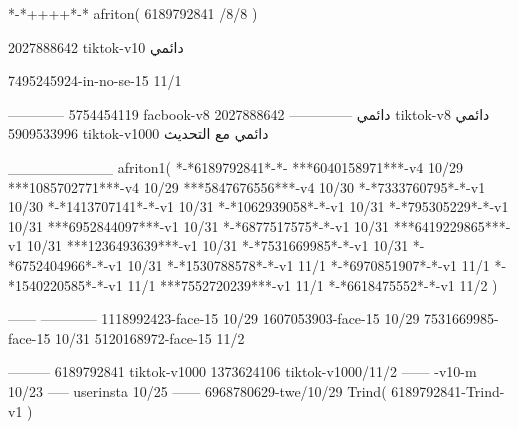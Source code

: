 *-*++++*-*
afriton(
6189792841 /8/8
)

2027888642 tiktok-v10
دائمي


7495245924-in-no-se-15 11/1

------------
5754454119 facbook-v8
دائمي
--------------
2027888642 tiktok-v8
دائمي
5909533996 tiktok-v1000
دائمي مع التحديث

__________
afriton1(
*-*6189792841*-*-
***6040158971***-v4 10/29
***1085702771***-v4 10/29
***5847676556***-v4 10/30
*-*7333760795*-*-v1 10/30
*-*1413707141*-*-v1 10/31
*-*1062939058*-*-v1 10/31
*-*795305229*-*-v1 10/31
***6952844097***-v1 10/31
*-*6877517575*-*-v1 10/31
***6419229865***-v1 10/31
***1236493639***-v1 10/31
*-*7531669985*-*-v1 10/31
*-*6752404966*-*-v1 10/31
*-*1530788578*-*-v1 11/1
*-*6970851907*-*-v1 11/1
*-*1540220585*-*-v1 11/1
***7552720239***-v1 11/1
*-*6618475552*-*-v1 11/2
)

------
------------
1118992423-face-15 10/29
1607053903-face-15 10/29
7531669985-face-15 10/31
5120168972-face-15 11/2

---------
6189792841 tiktok-v1000
1373624106 tiktok-v1000/11/2
------
-v10-m 10/23
-----
userinsta 10/25
------
6968780629-twe/10/29
Trind(
6189792841-Trind-v1 
)
